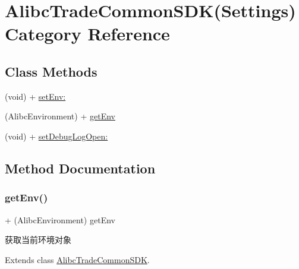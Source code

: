 \hypertarget{category_alibc_trade_common_s_d_k_07_settings_08}{}\section{Alibc\+Trade\+Common\+S\+DK(Settings) Category Reference}
\label{category_alibc_trade_common_s_d_k_07_settings_08}
\subsection*{Class Methods}
\begin{DoxyCompactItemize}
\item 
(void) + \mbox{\hyperlink{category_alibc_trade_common_s_d_k_07_settings_08_a780956aef5009a4b6fcbe3fc9f63f598}{set\+Env\+:}}
\item 
(Alibc\+Environment) + \mbox{\hyperlink{category_alibc_trade_common_s_d_k_07_settings_08_a52fffd9cecf92db99a9c187677a531da}{get\+Env}}
\item 
(void) + \mbox{\hyperlink{category_alibc_trade_common_s_d_k_07_settings_08_a078b422151a1f58252df135495ca6672}{set\+Debug\+Log\+Open\+:}}
\end{DoxyCompactItemize}


\subsection{Method Documentation}
\mbox{\label{category_alibc_trade_common_s_d_k_07_settings_08_a52fffd9cecf92db99a9c187677a531da}} 
\subsubsection{\texorpdfstring{get\+Env()}{getEnv()}}
{\footnotesize\ttfamily + (Alibc\+Environment) get\+Env \begin{DoxyParamCaption}{ }\end{DoxyParamCaption}}

获取当前环境对象 

Extends class \mbox{\hyperlink{interface_alibc_trade_common_s_d_k_a52fffd9cecf92db99a9c187677a531da}{Alibc\+Trade\+Common\+S\+DK}}.

